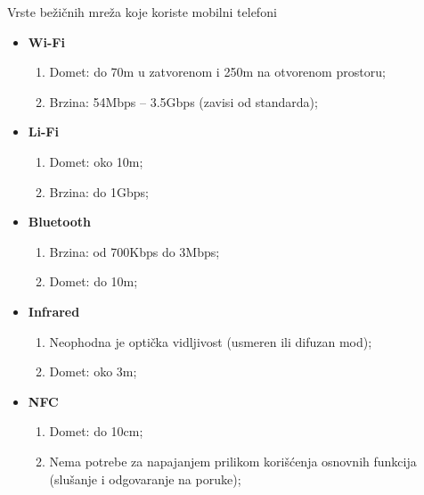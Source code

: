 \documentclass{beamer}
\begin{document}
\begin{frame}{Vrste bežičnih mreža koje koriste mobilni telefoni}
\begin{itemize}
    \item \textbf{Wi-Fi}
        \begin{enumerate}
            \item Domet: do 70m u zatvorenom i 250m na otvorenom prostoru;
            \item Brzina: 54Mbps – 3.5Gbps (zavisi od standarda);
        \end{enumerate}
    \item \textbf{Li-Fi}
        \begin{enumerate}
            \item Domet: oko 10m;
            \item Brzina: do 1Gbps;
        \end{enumerate} 
    \item \textbf{Bluetooth}
        \begin{enumerate}
            \item Brzina: od 700Kbps do 3Mbps;
            \item Domet: do 10m;
        \end{enumerate}
    \item \textbf{Infrared}
        \begin{enumerate}
            \item Neophodna je optička vidljivost (usmeren ili difuzan mod);
            \item Domet: oko 3m;
        \end{enumerate}
    \item \textbf{NFC}
        \begin{enumerate}
            \item Domet: do 10cm;
            \item Nema potrebe za napajanjem prilikom korišćenja osnovnih funkcija (slušanje i odgovaranje na poruke);
        \end{enumerate}
\end{itemize}
\end{frame}
\end{document}
